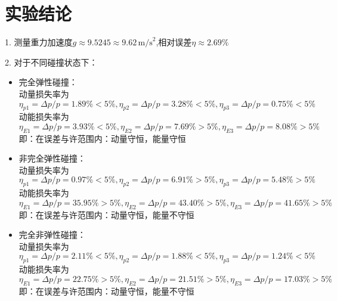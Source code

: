 \documentclass[12pt,a4paper]{article}
\begin{document}
	\section{实验结论}
	1. 测量重力加速度$g \approx 9.5245 \approx 9.62 \,\text{m/s}^2$,相对误差$\eta \approx 2.69\%$



2. 对于不同碰撞状态下：
\begin{itemize}
    \item 完全弹性碰撞：\\
		动量损失率为 $$\eta_{p1}=\Delta p/p=1.89\%<5\%,\eta_{p2}=\Delta p/p=3.28\%<5\%,\eta_{p3}=\Delta p/p=0.75\%<5\%$$
		动能损失率为 $$\eta_{E1}=\Delta p/p=3.93\%<5\%,\eta_{E2}=\Delta p/p=7.69\%>5\%,\eta_{E3}=\Delta p/p=8.08\%>5\%$$
		即：在误差与许范围内：动量守恒，能量守恒
    \item 非完全弹性碰撞：\\
		动量损失率为 $$\eta_{p1}=\Delta p/p=0.97\%<5\%,\eta_{p2}=\Delta p/p=6.91\%>5\%,\eta_{p3}=\Delta p/p=5.48\%>5\%$$
		动能损失率为 $$\eta_{E1}=\Delta p/p=35.95\%>5\%,\eta_{E2}=\Delta p/p=43.40\%>5\%,\eta_{E3}=\Delta p/p=41.65\%>5\%$$
		即：在误差与许范围内：动量守恒，能量不守恒
    \item 完全非弹性碰撞：\\
		动量损失率为 $$\eta_{p1}=\Delta p/p=2.11\%<5\%,\eta_{p2}=\Delta p/p=1.88\%<5\%,\eta_{p3}=\Delta p/p=1.24\%<5\%$$
		动能损失率为 $$\eta_{E1}=\Delta p/p=22.75\%>5\%,\eta_{E2}=\Delta p/p=21.51\%>5\%,\eta_{E3}=\Delta p/p=17.03\%>5\%$$
		即：在误差与许范围内：动量守恒，能量不守恒
\end{itemize}
	
\end{document}
